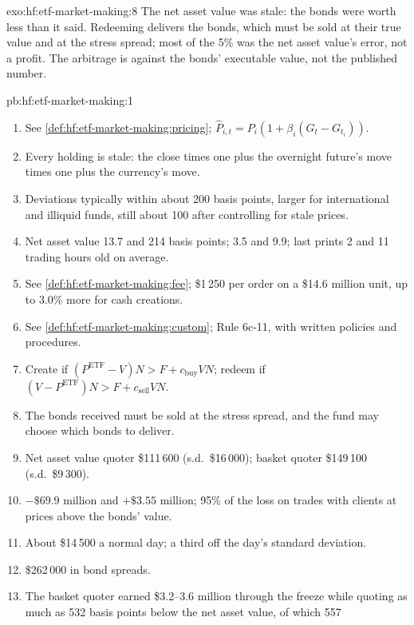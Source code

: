\begin{solution}{exo:hf:etf-market-making:8}
The net asset value was stale: the bonds were worth less than it said. Redeeming delivers the bonds, which must be sold at their true value and at the
stress spread; most of the 5\% was the net asset value's error, not a profit. The arbitrage is against the bonds' executable value, not the published
number.
\end{solution}

\begin{solution}{pb:hf:etf-market-making:1}
\begin{enumerate}
\item See \cref{def:hf:etf-market-making:pricing}; $\hat P_{i,t}=P_i(1+\beta_i(G_t-G_{t_i}))$.
\item Every holding is stale: the close times one plus the overnight future's move times one plus the currency's move.
\item Deviations typically within about 200 basis points, larger for international and illiquid funds, still about 100 after controlling for stale
prices.
\item Net asset value 13.7 and 214 basis points;  3.5 and 9.9; last prints 2 and 11 trading hours old on average.
\item See \cref{def:hf:etf-market-making:fee}; \$1\,250 per order on a \$14.6 million unit, up to 3.0\% more for cash creations.
\item See \cref{def:hf:etf-market-making:custom}; Rule 6c-11, with written policies and procedures.
\item Create if $(P^{\mathrm{ETF}}-V)N>F+c_{\mathrm{buy}}VN$; redeem if $(V-P^{\mathrm{ETF}})N>F+c_{\mathrm{sell}}VN$.
\item The bonds received must be sold at the stress spread, and the fund may choose which bonds to deliver.
\item Net asset value quoter \$111\,600 (s.d.\ \$16\,000); basket quoter \$149\,100 (s.d.\ \$9\,300).
\item $-\$69.9$ million and $+\$3.55$ million; 95\% of the loss on trades with clients at prices above the bonds' value.
\item About \$14\,500 a normal day; a third off the day's standard deviation.
\item \$262\,000 in bond spreads.
\item The basket quoter earned \$3.2--3.6 million through the freeze while quoting as much as 532 basis points below the net asset value, of which 557

\end{enumerate}
\end{solution}
